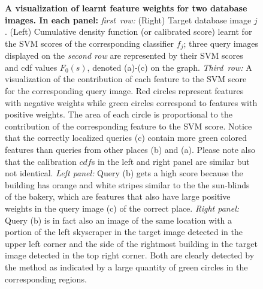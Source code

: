 \begin{figure}[]
    \vspace*{-2mm}
    \setcounter{figure}{5}
    \caption{
          {\bf  A visualization of learnt feature weights for two database images. In each panel:} 
         \emph{first~row:} (Right) Target database image $j$. (Left) Cumulative density function (or calibrated score) learnt for the SVM scores of the corresponding classifier $f_j$;  three query images displayed on the \emph{second row} are represented by their SVM scores and cdf values $F_0(s)$, denoted (a)-(c) on the graph. \emph{Third~row:} A visualization of the contribution of each feature to the SVM score for the corresponding query image. Red circles represent features with negative weights while green circles correspond to features with positive weights. The area of each circle is proportional to the contribution of the corresponding feature to the SVM score.
         Notice that the correctly localized queries (c) contain more green colored features than queries from other places (b) and (a).
           Please note also that the calibration $cdf$s in the left and right panel are similar but not identical. 
         {\it Left panel:} Query (b) gets a high score because the building has orange and white stripes similar to the the sun-blinds of the bakery, which are features that also have large positive weights in the query image (c) of the correct place.
         {\it Right panel:} Query (b) is in fact also an image of the same location with a portion of the left skyscraper in the target image detected in the upper left corner and the side of the rightmost building in the target image detected in the top right corner. Both are clearly detected by the method as indicated by a large quantity of green circles in the corresponding regions.
    }
    \label{fig:3qVSw}
    \vspace*{2mm}
      \setcounter{figure}{7}
  \end{figure}
%
